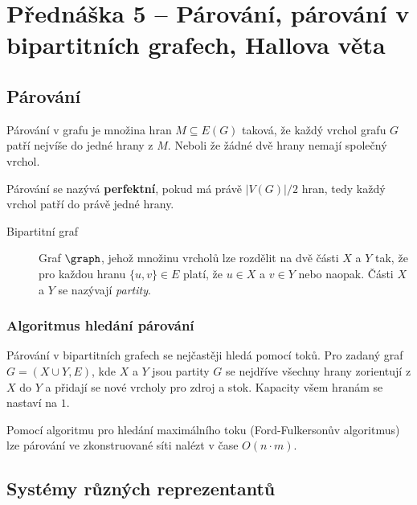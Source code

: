 \section{Přednáška 5 -- Párování, párování v bipartitních grafech, Hallova věta}

\subsection{Párování}

Párování v grafu je množina hran \(M \subseteq E(G)\) taková, že každý vrchol grafu $G$ patří nejvíše do jedné hrany z $M$.
Neboli že žádné dvě hrany nemají společný vrchol.

Párování se nazývá \textbf{perfektní}, pokud má právě \(|V(G)| / 2 \) hran, tedy každý vrchol patří do právě jedné hrany.

\begin{description}
    \item[Bipartitní graf] Graf $\graph$, jehož množinu vrcholů lze rozdělit na dvě části $X$ a $Y$ tak, že pro každou hranu $\{u,v\} \in E$ platí, že $u \in X$ a $v \in Y$ nebo naopak.
    Části $X$ a $Y$ se nazývají \textit{partity}.
\end{description}

\subsubsection{Algoritmus hledání párování}

Párování v bipartitních grafech se nejčastěji hledá pomocí toků.
Pro zadaný graf\newline $G=(X \cup Y,E)$, kde $X$ a $Y$ jsou partity $G$ se nejdříve všechny hrany zorientují z $X$ do $Y$ a přidají se nové vrcholy pro zdroj a stok.
Kapacity všem hranám se nastaví na $1$.



Pomocí algoritmu pro hledání maximálního toku (Ford-Fulkersonův algoritmus) lze párování ve zkonstruované síti nalézt v čase \(O(n\cdot{}m)\).

\subsection{Systémy různých reprezentantů}


